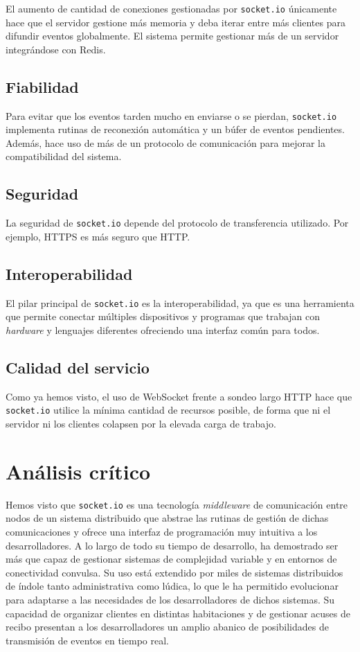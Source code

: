\documentclass[runningheads]{llncs}
\begin{document}
El aumento de cantidad de conexiones gestionadas por \texttt{socket.io} únicamente hace que el servidor gestione más memoria y deba iterar entre más clientes para difundir eventos globalmente.
El sistema permite gestionar más de un servidor integrándose con Redis\cite{redis}.

\subsection{Fiabilidad}

Para evitar que los eventos tarden mucho en enviarse o se pierdan, \texttt{socket.io} implementa rutinas de reconexión automática y un búfer de eventos pendientes.
Además, hace uso de más de un protocolo de comunicación para mejorar la compatibilidad del sistema.

\subsection{Seguridad}

La seguridad de \texttt{socket.io} depende del protocolo de transferencia utilizado.
Por ejemplo, HTTPS es más seguro que HTTP\@.

\subsection{Interoperabilidad}

El pilar principal de \texttt{socket.io} es la interoperabilidad, ya que es una herramienta que permite conectar múltiples dispositivos y programas que trabajan con \textit{hardware} y lenguajes diferentes ofreciendo una interfaz común para todos.

\subsection{Calidad del servicio}

Como ya hemos visto, el uso de WebSocket frente a sondeo largo HTTP hace que \texttt{socket.io} utilice la mínima cantidad de recursos posible, de forma que ni el servidor ni los clientes colapsen por la elevada carga de trabajo.

\section{Análisis crítico}

Hemos visto que \texttt{socket.io} es una tecnología \textit{middleware} de comunicación entre nodos de un sistema distribuido que abstrae las rutinas de gestión de dichas comunicaciones y ofrece una interfaz de programación muy intuitiva a los desarrolladores.
A lo largo de todo su tiempo de desarrollo, ha demostrado ser más que capaz de gestionar sistemas de complejidad variable y en entornos de conectividad convulsa.
Su uso está extendido por miles de sistemas distribuidos de índole tanto administrativa como lúdica, lo que le ha permitido evolucionar para adaptarse a las necesidades de los desarrolladores de dichos sistemas.
Su capacidad de organizar clientes en distintas habitaciones y de gestionar acuses de recibo presentan a los desarrolladores un amplio abanico de posibilidades de transmisión de eventos en tiempo real.
\end{document}

